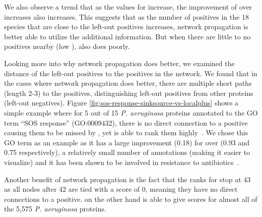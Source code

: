 We also observe a trend that as the \fmax values for \localplus increase, the improvement of \sinksource over \localplus increases also increases. 
This suggests that as the number of positives in the 18 species that are close to the left-out positives increases, network propagation is better able to utilize the additional information.
But when there are little to no positives nearby (low \localplus \fmax), \sinksource also does poorly.

Looking more into why network propagation does better, we examined the distance of the left-out positives to the positives in the network.  
We found that in the cases where network propagation does better, there are multiple short paths (length 2-3) to the positives, distinguishing left-out positives from other proteins (left-out negatives). 
Figure \ref{fig:sos-response-sinksource-vs-localplus} shows a simple example where for 5 out of 15 \textit{P. aeruginosa} proteins annotated to the GO term ``SOS response'' (GO:0009432), there is no direct connection to a positive causing them to be missed by \localplus, yet \sinksource is able to rank them highly~.
We chose this GO term as an example as it has a large \fmax improvement (0.18) for \sinksource over \localplus (0.93 and 0.75 respectively), a relatively small number of annotations (making it easier to visualize) and it has been shown to be involved in resistance to antibiotics~.

Another benefit of network propagation is the fact that the ranks for \localplus stop at 43 as all nodes after 42 are tied with a score of 0, meaning they have no direct connections to a positive. 
\sinksource on the other hand is able to give scores for almost all of the 5,575 \textit{P. aeruginosa} proteins.

